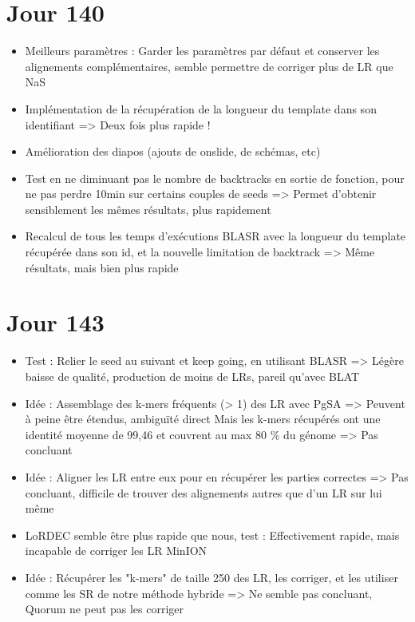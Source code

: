 \documentclass[12pt]{report}
\begin{document}
\section{Jour 140}

\begin{itemize}
	\item Meilleurs paramètres : Garder les paramètres par défaut et conserver les alignements complémentaires, semble permettre de corriger plus
		  de LR que NaS
		  
	\item Implémentation de la récupération de la longueur du template dans son identifiant
		  => Deux fois plus rapide !
		  
	\item Amélioration des diapos (ajouts de onslide, de schémas, etc)
	
	\item Test en ne diminuant pas le nombre de backtracks en sortie de fonction, pour ne pas perdre 10min sur certains couples de seeds
		  => Permet d'obtenir sensiblement les mêmes résultats, plus rapidement
	
	\item Recalcul de tous les temps d'exécutions BLASR avec la longueur du template récupérée dans son id, et la nouvelle limitation de backtrack
		  => Même résultats, mais bien plus rapide
\end{itemize}

\section{Jour 143}

\begin{itemize}
	\item Test : Relier le seed au suivant et keep going, en utilisant BLASR => Légère baisse de qualité, production de moins de LRs,
		  pareil qu'avec BLAT
	
	\item Idée : Assemblage des k-mers fréquents (> 1) des LR avec PgSA => Peuvent à peine être étendus, ambiguïté direct
		  Mais les k-mers récupérés ont une identité moyenne de 99,46 et couvrent au max 80 \% du génome => Pas concluant
		  
	\item Idée : Aligner les LR entre eux pour en récupérer les parties correctes => Pas concluant, difficile de trouver des alignements
		  autres que d'un LR sur lui même
	
	\item LoRDEC semble être plus rapide que nous, test : Effectivement rapide, mais incapable de corriger les LR MinION
	
	\item Idée : Récupérer les "k-mers" de taille 250 des LR, les corriger, et les utiliser comme les SR de notre méthode hybride
		  => Ne semble pas concluant, Quorum ne peut pas les corriger
\end{itemize}
\end{document}
